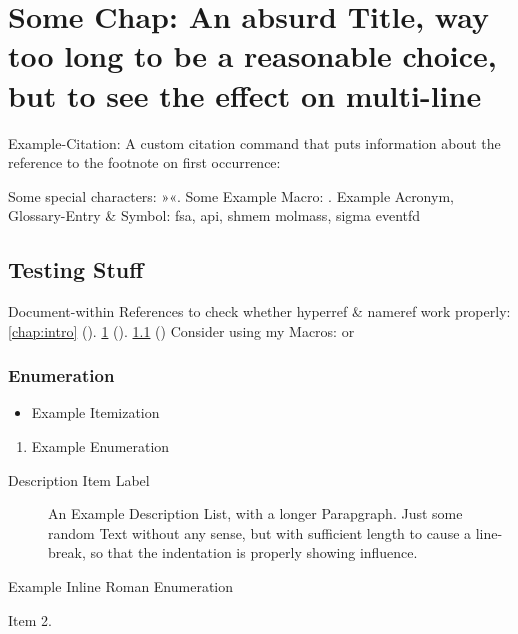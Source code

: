 
\chapter[Alternative "Some Chap" Title. Shorter for page-heading]{Some Chap: An absurd Title, way too long to be a reasonable choice, but to see the effect on multi-line}
\label{chap:chapter1}

Example-Citation:
\cite{DenKr_denkrement1_indeco}
\nl%
A custom citation command that puts information about the reference to the footnote on first occurrence:
%

\npi%
Some special characters:
»«.
\nl%
Some Example Macro:
.
\nl%
Example Acronym, Glossary-Entry \& Symbol:\nl
\gls{fsa}, \gls{api}, \gls{shmem}\nl
\gls{molmass}, \gls{sigma}\nl
\gls{eventfd}


\section{Testing Stuff}
\label{sec:testing}

Document-within References to check whether hyperref \& nameref work properly:\nl%
\ref{chap:intro} (). \ref{chap:chapter1}  (). \ref{sec:testing} ()\nl%
Consider using my Macros:\nl
{} or 



\subsection{Enumeration}

\begin{itemize}
\item%
    Example Itemization
\end{itemize}
\begin{enumerate}
\item%
    Example Enumeration
\end{enumerate}
\begin{description}
\item[Description Item Label]%
    An Example Description List, with a longer Parapgraph. Just some random Text without any sense, but with sufficient length to cause a line-break, so that the indentation is properly showing influence.
\end{description}
\begin{enuminlrom}
\item%
    Example Inline Roman Enumeration
\item%
    Item 2.
\end{enuminlrom}


